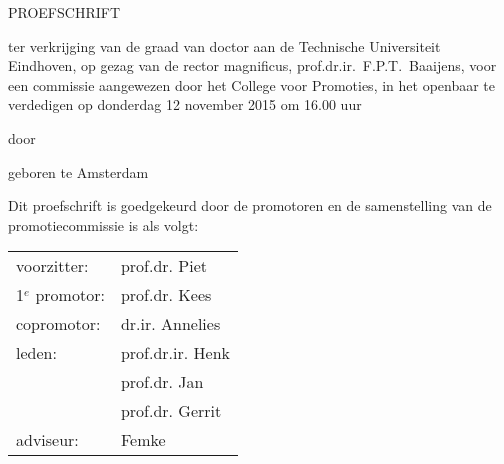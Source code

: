 \thispagestyle{empty}


\begin{center}
  \vspace*{1cm}
  {\Huge \textbf{\ttitle}}

  \vspace{2.5cm}

  {\Large PROEFSCHRIFT}

  \vspace{2.5cm}

  \begin{minipage}{0.85\textwidth}
    \begin{sloppypar}
      ter verkrijging van de graad van doctor aan de Technische Universiteit
      Eindhoven, op gezag van de rector magnificus,
      prof.dr.ir.~F.P.T.~Baaijens, voor een commissie aangewezen door het
      College voor Promoties, in het openbaar te verdedigen op donderdag 12
      november 2015 om 16.00 uur
    \end{sloppypar}
  \end{minipage}

  \vspace{2cm}

  door

  \vspace{2cm}

  \tauthor

  \vspace{2cm}

  geboren te Amsterdam
\end{center}

\clearpage
\thispagestyle{empty}
\noindent Dit proefschrift is goedgekeurd door de promotoren en de
samenstelling van de promotiecommissie is als volgt:

\vspace{0.7cm}

\noindent
\begin{tabularx}{\textwidth}{@{}ll}
  voorzitter: & prof.dr. Piet \\
  1$^e$ promotor: & prof.dr. Kees \\
  copromotor: & dr.ir. Annelies \\
  leden: & prof.dr.ir. Henk \\
              & prof.dr. Jan \\
              & prof.dr. Gerrit\\
  adviseur: & Femke
\end{tabularx}

